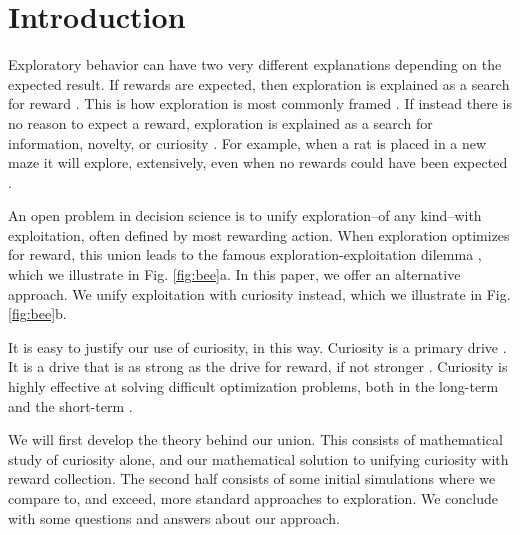 \section*{Introduction}
Exploratory behavior can have two very different explanations depending on the expected result. If rewards are expected, then exploration is explained as a search for reward \cite{Gupta2006,Sutton2018,Woodgate2017,Lee2011a,Schulz2018a,Calhoun2014}. This is how exploration is most commonly framed \cite{Sutton2018}. If instead there is no reason to expect a reward, exploration is explained as a search for information, novelty, or curiosity \cite{Berlyne1950,Schmidhuber1991,Kidd2015,Jaegle2019,Sumner2019,Wang2019,Auersperg2015}. For example, when a rat is placed in a new maze it will explore, extensively, even when no rewards could have been expected \cite{Rosenberg2021}.

An open problem in decision science is to unify exploration--of any kind--with exploitation, often defined by most rewarding action. When exploration optimizes for reward, this union leads to the famous exploration-exploitation dilemma \cite{Kelly1956,Berger-Tal2014,Dayan1996,Thrun1992,Mehlhorn2015,Kobayashi2019}, which we illustrate in Fig. \ref{fig:bee}a. In this paper, we offer an alternative approach. We unify exploitation with curiosity instead, which we illustrate in Fig. \ref{fig:bee}b.  

It is easy to justify our use of curiosity, in this way. Curiosity is a primary drive \cite{Berlyne1950,Loewenstein1994,Inglis2001}. It is a drive that is as strong as the drive for reward, if not stronger \cite{Loewenstein1994,Kidd2015,Gottlieb2018,Sumner2019,Gopnik2020,Song2019,Wang2019}. Curiosity is highly effective at solving difficult optimization problems, both in the long-term and the short-term \cite{Schmidhuber1991,Pathak2017,Stanton2018,Fister2019,Mouret2015,Colas2020,Cully2015,Pathak2017,Schwartenbeck2019,Laversanne-Finot2018}. 

We will first develop the theory behind our union. This consists of mathematical study of curiosity alone, and our mathematical solution to unifying curiosity with reward collection. The second half consists of some initial simulations where we compare to, and exceed, more standard approaches to exploration. We conclude with some questions and answers about our approach.

